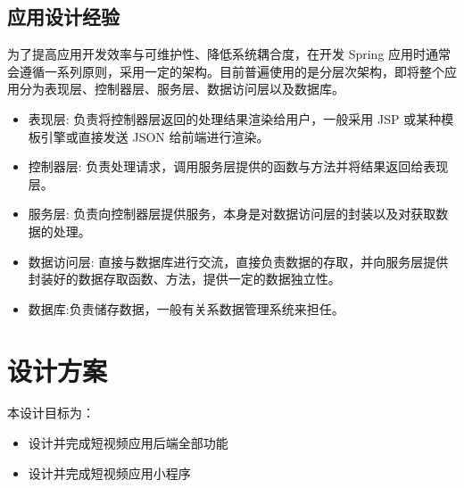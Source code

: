 \documentclass[a4paper, 12pt, UTF8]{ctexart}
\begin{document}
	\subsection{应用设计经验}
	为了提高应用开发效率与可维护性、降低系统耦合度，在开发 Spring 应用时通常会遵循一系列原则，采用一定的架构。目前普遍使用的是分层次架构，即将整个应用分为表现层、控制器层、服务层、数据访问层以及数据库\cite{杨开振2018}。
	\begin{itemize}
  \item 表现层: 负责将控制器层返回的处理结果渲染给用户，一般采用 JSP 或某种模板引擎或直接发送 JSON 给前端进行渲染。
  \item 控制器层: 负责处理请求，调用服务层提供的函数与方法并将结果返回给表现层。
  \item 服务层: 负责向控制器层提供服务，本身是对数据访问层的封装以及对获取数据的处理。
  \item 数据访问层: 直接与数据库进行交流，直接负责数据的存取，并向服务层提供封装好的数据存取函数、方法，提供一定的数据独立性。
  \item 数据库:负责储存数据，一般有关系数据管理系统来担任。
\end{itemize}

	
	\section{设计方案}
	本设计目标为：
	\begin{itemize}
  \item 设计并完成短视频应用后端全部功能
  \item 设计并完成短视频应用小程序
\end{itemize}
\end{document}
